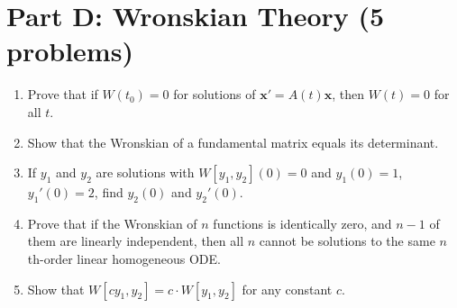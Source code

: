 \documentclass[12pt]{article}
\begin{document}

\section*{Part D: Wronskian Theory (5 problems)}

\begin{enumerate}[resume]
\item Prove that if $W(t_{0}) = 0$ for solutions of $\mathbf{x}' = A(t)\mathbf{x}$, then $W(t) = 0$ for all $t$.

\item Show that the Wronskian of a fundamental matrix equals its determinant.

\item If $y_{1}$ and $y_{2}$ are solutions with $W[y_{1}, y_{2}](0) = 0$ and $y_{1}(0) = 1$, $y_{1}'(0) = 2$, find $y_{2}(0)$ and $y_{2}'(0)$.

\item Prove that if the Wronskian of $n$ functions is identically zero, and $n-1$ of them are linearly independent, then all $n$ cannot be solutions to the same $n$th-order linear homogeneous ODE.

\item Show that $W[cy_{1}, y_{2}] = c \cdot W[y_{1}, y_{2}]$ for any constant $c$.
\end{enumerate}
\end{document}
